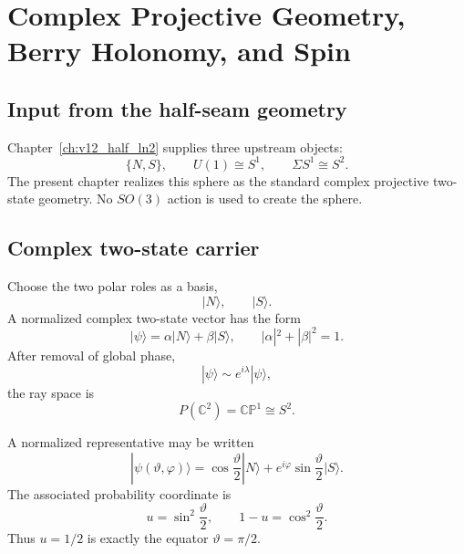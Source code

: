 \chapter{Complex Projective Geometry, Berry Holonomy, and Spin}
\label{ch:v12_complex_carrier}

\section{Input from the half-seam geometry}

Chapter~\ref{ch:v12_half_ln2} supplies three upstream objects:
\begin{equation}
\boxed{
\{N,S\},
\qquad
U(1)\cong S^1,
\qquad
\Sigma S^1\cong S^2.
}
\label{eq:v12_ch3_input}
\end{equation}
The present chapter realizes this sphere as the standard complex projective two-state geometry. No $SO(3)$ action is used to create the sphere.

\section{Complex two-state carrier}

Choose the two polar roles as a basis,
\begin{equation}
|N\rangle,\qquad |S\rangle.
\end{equation}
A normalized complex two-state vector has the form
\begin{equation}
|\psi\rangle
=
\alpha|N\rangle+\beta|S\rangle,
\qquad
|\alpha|^2+|\beta|^2=1.
\end{equation}
After removal of global phase,
\begin{equation}
|\psi\rangle\sim e^{i\lambda}|\psi\rangle,
\end{equation}
the ray space is
\begin{equation}
\boxed{
P(\mathbb C^2)
=
\mathbb{CP}^1
\cong
S^2.
}
\label{eq:v12_cp1_s2}
\end{equation}

A normalized representative may be written
\begin{equation}
\boxed{
|\psi(\vartheta,\varphi)\rangle
=
\cos\frac{\vartheta}{2}|N\rangle
+
e^{i\varphi}\sin\frac{\vartheta}{2}|S\rangle.
}
\label{eq:v12_spinor_spherical}
\end{equation}
The associated probability coordinate is
\begin{equation}
u=\sin^2\frac{\vartheta}{2},
\qquad
1-u=\cos^2\frac{\vartheta}{2}.
\end{equation}
Thus $u=1/2$ is exactly the equator $\vartheta=\pi/2$.

